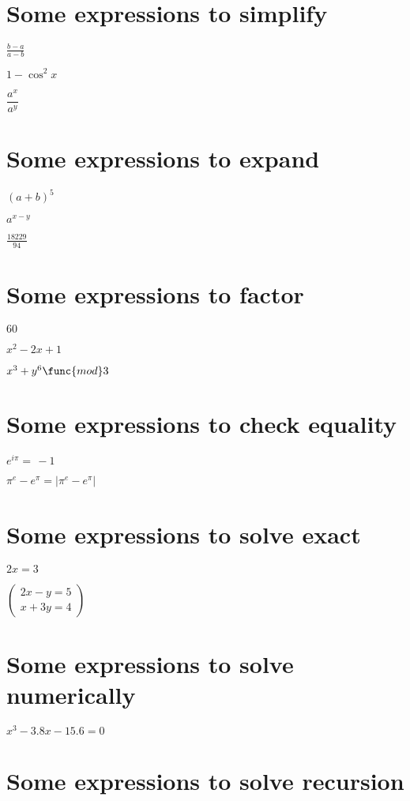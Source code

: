 \documentclass{article}
\begin{document}
\section{Some expressions to simplify}

$\frac{b-a}{a-b}$

$1-\cos ^{2}x$

$\dfrac{a^{x}}{a^{y}}$

\section{Some expressions to expand}

$\left( a+b\right) ^{5}$

$a^{x-y}$

$\frac{18229}{94}$

\section{Some expressions to factor}

$60$

$x^{2}-2x+1$

$x^{3}+y^{6}\func{mod}3$

\section{Some expressions to check equality}

$e^{i\pi }=\,-1$

$\pi ^{e}-e^{\pi }=\left\vert \pi ^{e}-e^{\pi }\right\vert $

\section{Some expressions to solve exact}

$2x=3$

$\left( 
\begin{array}{c}
2x-y=5 \\ 
x+3y=4%
\end{array}%
\right) $

\section{Some expressions to solve numerically}

$x^{3}-3.8x-15.6=0$

\section{Some expressions to solve recursion}
\end{document}
